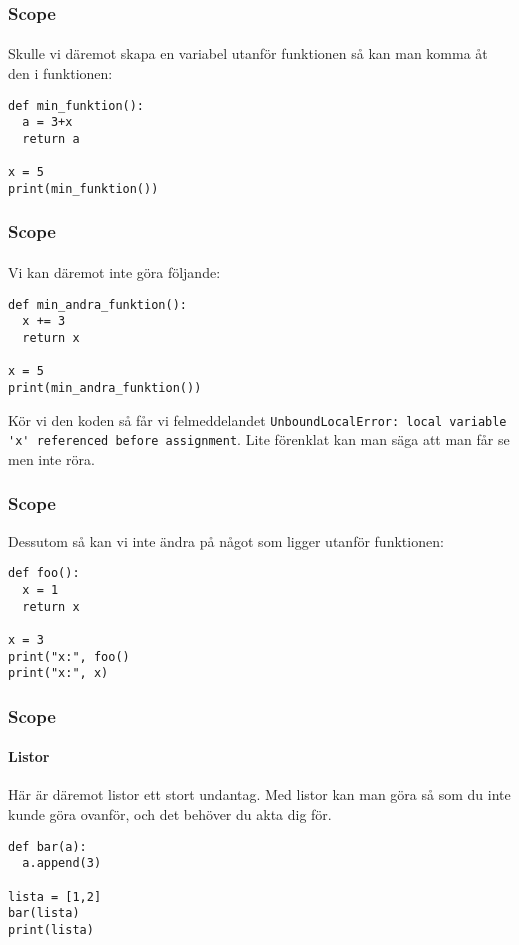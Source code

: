 \documentclass[aspectratio=169]{beamer}
\begin{document}
\begin{frame}[fragile]
	\frametitle{Scope}
	\framesubtitle{}
	
	Skulle vi däremot skapa en variabel utanför funktionen så kan man komma åt den i funktionen:
	
	\begin{lstlisting}
def min_funktion():
  a = 3+x
  return a

x = 5
print(min_funktion())
	\end{lstlisting}
	
\end{frame}

\begin{frame}[fragile]
	\frametitle{Scope}
	\framesubtitle{}
	
	Vi kan däremot inte göra följande:
	
	\begin{lstlisting}
def min_andra_funktion():
  x += 3
  return x

x = 5
print(min_andra_funktion())
	\end{lstlisting}
	
	Kör vi den koden så får vi felmeddelandet \lstinline{UnboundLocalError: local variable 'x' referenced before assignment}. Lite förenklat kan man säga att man får se men inte röra.
	
\end{frame}

\begin{frame}[fragile]
	\frametitle{Scope}
	
	Dessutom så kan vi inte ändra på något som ligger utanför funktionen:
	
	\begin{lstlisting}
def foo():
  x = 1
  return x

x = 3
print("x:", foo()
print("x:", x)
	\end{lstlisting}
	
\end{frame}

\begin{frame}[fragile]
	\frametitle{Scope}
	\framesubtitle{Listor}
	
	Här är däremot listor ett stort undantag. Med listor kan man göra så som du inte kunde göra ovanför, och det behöver du akta dig för.
	
	\begin{lstlisting}
def bar(a):
  a.append(3)

lista = [1,2]
bar(lista)
print(lista)
	\end{lstlisting}

\end{frame}
\end{document}
